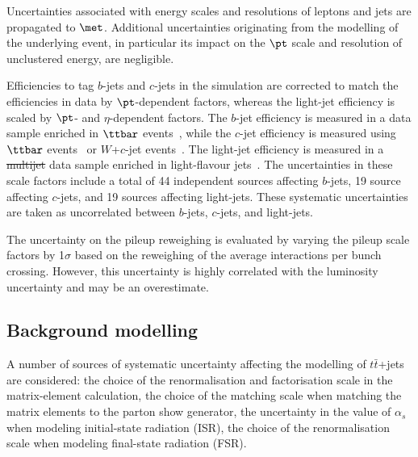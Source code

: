 \documentclass[PAPER, coverpage, atlasdraft=true, texlive=2016, UKenglish]{\ATLASLATEXPATH atlasdoc}
\providecommand{\DIFadd}[1]{{\protect\color{blue}\uwave{#1}}} %
\providecommand{\DIFdel}[1]{{\protect\color{red}\sout{#1}}}                      %
\providecommand{\DIFaddbegin}{} %
\providecommand{\DIFaddend}{} %
\providecommand{\DIFdelbegin}{} %
\providecommand{\DIFdelend}{} %
\begin{document}
Uncertainties associated with energy scales and resolutions of leptons and jets 
are propagated to $\met$. Additional uncertainties originating from the modelling 
of the underlying event, in particular its impact on the $\pt$ scale and resolution 
of unclustered energy, are negligible.

Efficiencies to tag $b$-jets and $c$-jets in the simulation are corrected to match the efficiencies in data by $\pt$-dependent factors,
whereas the light-jet efficiency is scaled by $\pt$- and $\eta$-dependent factors.
The $b$-jet efficiency is measured in a data sample enriched in $\ttbar$ events~\cite{Aad:2019epj79}, %
  while the $c$-jet efficiency is measured
using $\ttbar$ events~\cite{ATLAS-CONF-2018-001} or $W$+$c$-jet events~\cite{Aad:2015ydr}. 
The light-jet efficiency is measured in a \DIFdelbegin \DIFdel{multijet }\DIFdelend \DIFaddbegin \DIFadd{multi-jet }\DIFaddend data sample enriched in light-flavour jets~\cite{ATLAS-CONF-2018-006}.
The uncertainties in these scale factors include a total of 44 independent sources affecting $b$-jets, 19 source affecting $c$-jets, and 19 sources affecting light-jets. 
These systematic uncertainties are taken as uncorrelated between $b$-jets, $c$-jets, and light-jets.

The uncertainty on the pileup reweighing is evaluated by varying the pileup scale factors
by 1$\sigma$ based on the reweighing of the average interactions per bunch crossing. However, this
uncertainty is highly correlated with the luminosity uncertainty and may be an overestimate.

\subsection{Background modelling}
\label{sec:syst_bkgmodeling}

A number of sources of systematic uncertainty affecting the modelling of $t\bar{t}$+jets are considered: the choice of the renormalisation and factorisation scale in the matrix-element calculation, the choice of the matching scale when matching the matrix elements to the parton show generator, the uncertainty in the value of $\alpha_s$ when modeling initial-state radiation (ISR), the choice of the renormalisation scale when modeling final-state radiation (FSR).
\end{document}

